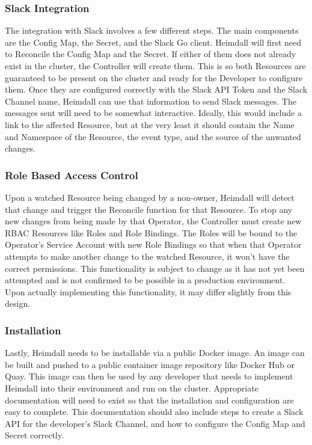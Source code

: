 \documentclass{article}
\begin{document}
\subsubsection{Slack Integration}

The integration with Slack involves a few different steps. The main components are the Config Map, the Secret, and the Slack Go client. Heimdall will first need to Reconcile the Config Map and the Secret. If either of them does not already exist in the cluster, the Controller will create them. This is so both Resources are guaranteed to be present on the cluster and ready for the Developer to configure them. Once they are configured correctly with the Slack API Token and the Slack Channel name, Heimdall can use that information to send Slack messages. The messages sent will need to be somewhat interactive. Ideally, this would include a link to the affected Resource, but at the very least it should contain the Name and Namespace of the Resource, the event type, and the source of the unwanted changes.

\subsubsection{Role Based Access Control} \label{security}

Upon a watched Resource being changed by a non-owner, Heimdall will detect that change and trigger the Reconcile function for that Resource. To stop any new changes from being made by that Operator, the Controller must create new RBAC Resources like Roles and Role Bindings. The Roles will be bound to the Operator's Service Account with new Role Bindings so that when that Operator attempts to make another change to the watched Resource, it won't have the correct permissions. This functionality is subject to change as it has not yet been attempted and is not confirmed to be possible in a production environment. Upon actually implementing this functionality, it may differ slightly from this design.


\subsubsection{Installation}

Lastly, Heimdall needs to be installable via a public Docker image. An image can be built and pushed to a public container image repository like Docker Hub or Quay. This image can then be used by any developer that needs to implement Heimdall into their environment and run on the cluster. Appropriate documentation will need to exist so that the installation and configuration are easy to complete. This documentation should also include steps to create a Slack API for the developer's Slack Channel, and how to configure the Config Map and Secret correctly.
\end{document}
